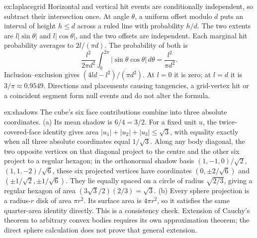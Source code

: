 \begin{solution}{ex:laplacegrid}
\idea Horizontal and vertical hit events are conditionally independent, so subtract their intersection once.
\writeup At angle $\theta$, a uniform offset modulo $d$ puts an interval of height $h\le d$ across a ruled line with probability $h/d$. The two extents are $l|\sin\theta|$ and $l|\cos\theta|$, and the two offsets are independent. Each marginal hit probability averages to $2l/(\pi d)$. The probability of both is
\[
\frac{l^2}{2\pi d^2}\int_0^{2\pi}|\sin\theta\cos\theta|\,d\theta
=\frac{l^2}{\pi d^2}.
\]
Inclusion--exclusion gives $(4ld-l^2)/(\pi d^2)$. At $l=0$ it is zero; at $l=d$ it is $3/\pi\approx0.9549$. Directions and placements causing tangencies, a grid-vertex hit or a coincident segment form null events and do not alter the formula.
\end{solution}

\begin{solution}{ex:shadows}
\idea The cube's six face contributions combine into three absolute coordinates.
\writeup (a) Its mean shadow is $6/4=3/2$. For a fixed unit $u$, the twice-covered-face identity gives area $|u_1|+|u_2|+|u_3|\le\sqrt3$, with equality exactly when all three absolute coordinates equal $1/\sqrt3$. Along any body diagonal, the two opposite vertices on that diagonal project to the centre and the other six project to a regular hexagon; in the orthonormal shadow basis $(1,-1,0)/\sqrt2$, $(1,1,-2)/\sqrt6$, these six projected vertices have coordinates $(0,\pm2/\sqrt6)$ and $(\pm1/\sqrt2,\pm1/\sqrt6)$. They lie equally spaced on a circle of radius $\sqrt{2/3}$, giving a regular hexagon of area $(3\sqrt3/2)(2/3)=\sqrt3$.
(b) Every sphere projection is a radius-$r$ disk of area $\pi r^2$. Its surface area is $4\pi r^2$, so it satisfies the same quarter-area identity directly. This is a consistency check. Extension of Cauchy's theorem to arbitrary convex bodies requires its own approximation theorem; the direct sphere calculation does not prove that general extension.
\end{solution}

